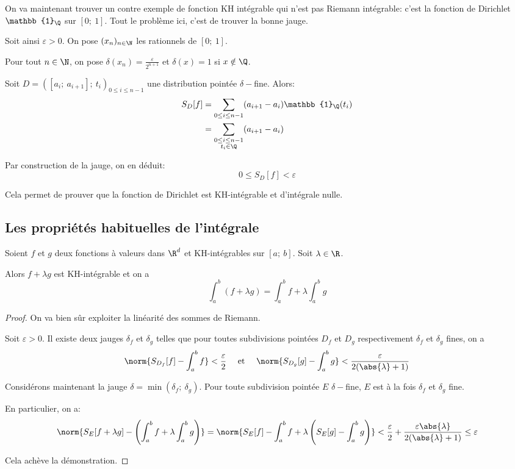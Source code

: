 On va maintenant trouver un contre exemple de fonction KH intégrable qui n'est pas Riemann intégrable: c'est la fonction de Dirichlet $\mathbb{1}_\Q$ sur $[0;~1]$. Tout le problème ici, c'est de trouver la bonne jauge.

Soit ainsi $\varepsilon>0$. On pose $(x_n)_{n \in \N}$ les rationnels de $[0;~1]$. 

Pour tout $n \in \N$, on pose $\delta(x_n) = \frac{\varepsilon}{2^{n+1}}$ et $\delta(x) = 1$ si $x \notin \Q$.

Soit $D = \left ([a_i;~a_{i+1}];~t_i\right )_{0 \leq i \leq n-1}$ une distribution pointée $\delta-$fine. Alors:
\begin{align*}
S_D[f] & = \displaystyle{\sum \limits_{0 \leq i \leq n-1}} (a_{i+1}-a_i) \mathbb{1}_{\Q}(t_i) \\
 & = \displaystyle{\sum \limits_{\substack{0 \leq i \leq n-1\\ t_i \in \Q}}} (a_{i+1}-a_i)
\end{align*}

Par construction de la jauge, on en déduit:
\[
0 \leq S_D[f] < \varepsilon
\]

Cela permet de prouver que la fonction de Dirichlet est KH-intégrable et d'intégrale nulle.

\subsection{Les propriétés habituelles de l'intégrale}


\begin{prop}
Soient $f$ et $g$ deux fonctions à valeurs dans $\R^d$ et KH-intégrables sur $[a;~b]$. Soit $\lambda \in \R$.

Alors $f + \lambda g$ est KH-intégrable et on a
\[
\int_a^b (f + \lambda g) = \int_a^b f + \lambda \int_a^b g
\]
\end{prop}


\begin{proof}
On va bien sûr exploiter la linéarité des sommes de Riemann.

Soit $\varepsilon>0$. Il existe deux jauges $\delta_f$ et $\delta_g$ telles que pour toutes subdivisions pointées $D_f$ et $D_g$ respectivement $\delta_f$ et $\delta_g$ fines, on a
\[
\norm{S_{D_f}[f] - \int_a^b f} < \dfrac{\varepsilon}{2} \quad \text{ et } \quad \norm{S_{D_g}[g] - \int_a^b g} < \dfrac{\varepsilon}{2 (\abs{\lambda}+1)}
\]

Considérons maintenant la jauge $\delta=\min(\delta_f;~\delta_g)$. Pour toute subdivision pointée $E$ $\delta-$fine, $E$ est à la fois $\delta_f$ et $\delta_g$ fine.

En particulier, on a:
\[
\norm{S_E[f + \lambda g] - \left ( \int_a^b f + \lambda \int_a^b g \right )} = \norm{S_E[f]-\int_a^b f + \lambda \left ( S_E[g] - \int_a^b g\right )} < \dfrac{\varepsilon}{2} + \dfrac{\varepsilon \abs{\lambda}}{2 (\abs{\lambda}+1)} \leq \varepsilon
\]

Cela achève la démonstration.
\end{proof}

